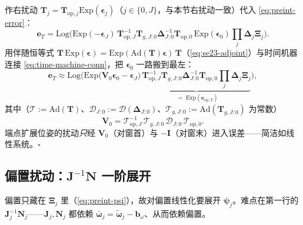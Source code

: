 \begin{derivation}
\label{deriv:preint-V0}
作右扰动 $\mathbf{T}_j=\mathbf{T}_{\mathrm{op},j}\mathrm{Exp}(\boldsymbol{\epsilon}_j)$（$j\in\{0,J\}$，与本节右扰动一致）代入 \cref{eq:preint-error}：
\[
  \mathbf{e}_T=\mathrm{Log}\!\Big(\mathrm{Exp}(-\boldsymbol{\epsilon}_J)\,\mathbf{T}_{\mathrm{op},J}^{-1}\mathbf{T}_{g,J:0}\boldsymbol{\Delta}_{J:0}^{-1}\mathbf{T}_{\mathrm{op},0}\,\mathrm{Exp}(\boldsymbol{\epsilon}_0)\textstyle\prod_j\boldsymbol{\Delta}_j\boldsymbol{\Xi}_j\Big).
\]
用伴随恒等式 $\mathbf{T}\,\mathrm{Exp}(\boldsymbol{\epsilon})=\mathrm{Exp}(\mathrm{Ad}(\mathbf{T})\boldsymbol{\epsilon})\,\mathbf{T}$（\cref{eq:se23-adjoint}）与时间机器连接 \cref{eq:time-machine-conn}，把 $\boldsymbol{\epsilon}_0$ 一路搬到最左：
\begin{equation}
  \mathbf{e}_T\approx\mathrm{Log}\!\Big(\mathrm{Exp}\!\big(\mathbf{V}_0\boldsymbol{\epsilon}_0-\boldsymbol{\epsilon}_J\big)\,\underbrace{\mathbf{T}_{\mathrm{op},J}^{-1}\mathbf{T}_{g,J:0}\boldsymbol{\Delta}_{J:0}^{-1}\mathbf{T}_{\mathrm{op},0}\textstyle\prod_j\boldsymbol{\Delta}_j\boldsymbol{\Xi}_j}_{\;=\;\mathrm{Exp}(\mathbf{e}_{\mathrm{op},T})}\Big),
  \label{eq:preint-eT-pert}
\end{equation}
其中（$\boldsymbol{\mathcal{T}}:=\mathrm{Ad}(\mathbf{T})$、$\boldsymbol{\mathcal{D}}_{J:0}:=\boldsymbol{\mathcal{D}}(\boldsymbol{\Delta}_{J:0})$、$\boldsymbol{\mathcal{T}}_{g,J:0}:=\mathrm{Ad}(\mathbf{T}_{g,J:0})$ 为常数）
\begin{equation}
  \mathbf{V}_0=\boldsymbol{\mathcal{T}}_{\mathrm{op},J}^{-1}\,\boldsymbol{\mathcal{T}}_{g,J:0}\,\boldsymbol{\mathcal{D}}_{J:0}\,\boldsymbol{\mathcal{T}}_{\mathrm{op},0}.
  \label{eq:preint-V0}
\end{equation}
端点扩展位姿的扰动\emph{只}经 $\mathbf{V}_0$（对窗首）与 $-\mathbf{I}$（对窗末）进入误差——简洁如线性系统。$\square$
\end{derivation}

\subsection{偏置扰动：\texorpdfstring{$\mathbf{J}^{-1}\mathbf{N}$}{J-inv N} 一阶展开}
\label{subsec:preint-bias}

偏置只藏在 $\boldsymbol{\Xi}_j$ 里（\cref{eq:preint-psi}），故对偏置线性化要展开 $\boldsymbol{\psi}_j$。难点在第一行的 $\mathbf{J}_j^{-1}\mathbf{N}_j$——$\mathbf{J}_j,\mathbf{N}_j$ 都依赖 $\bar{\boldsymbol{\omega}}_j=\tilde{\boldsymbol{\omega}}_j-\mathbf{b}_\omega$、从而依赖偏置。

